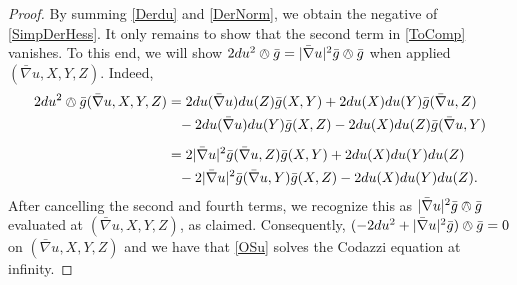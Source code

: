 \documentclass{amsart}
\begin{document}
\begin{proof}
By summing \eqref{Derdu} and \eqref{DerNorm}, we obtain the negative of \eqref{SimpDerHess}.
It only remains to show that the second term in \eqref{ToComp} vanishes. 
To this end, we will show $2du^2\owedge\bar{g} = |\bar{\nabla}u|^2\bar{g}\owedge \bar{g}$ when applied $(\bar{\nabla}u,X,Y,Z)$.
Indeed,
\begin{align*}
2du^2\owedge\bar{g}(\bar{\nabla}u,X,Y,Z)
&= 2du(\bar{\nabla}u)du(Z)\bar{g}(X,Y) + 2du(X)du(Y)\bar{g}(\bar{\nabla}u,Z) \\
&\phantom{=} - 2du(\bar{\nabla}u)du(Y)\bar{g}(X,Z) - 2du(X)du(Z)\bar{g}(\bar{\nabla}u,Y) \\[5pt]
&= 2|\bar{\nabla}u|^2\bar{g}(\bar{\nabla}u,Z)\bar{g}(X,Y) + 2du(X)du(Y)du(Z) \\
&\phantom{=} - 2|\bar{\nabla}u|^2\bar{g}(\bar{\nabla}u,Y)\bar{g}(X,Z) -2du(X)du(Y)du(Z).
\end{align*}
After cancelling the second and fourth terms, we recognize this as $|\bar{\nabla}u|^2\bar{g}\owedge\bar{g}$ evaluated at $(\bar{\nabla}u,X,Y,Z)$, as claimed.
Consequently, $(- 2 du^2 + |\bar{\nabla}u|^2 \bar{g})\owedge \bar{g} = 0$ on $(\bar{\nabla}u,X,Y,Z)$ and we have that \eqref{OSu} solves the Codazzi equation at infinity. 



\end{proof}
\end{document}
